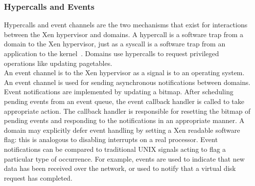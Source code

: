\subsubsection*{Hypercalls and Events}
Hypercalls and event channels are the two mechanisms that exist for interactions between the Xen hypervisor and domains. A hypercall is a software trap from a domain to the Xen hypervisor, just as a syscall is a software trap from an application to the kernel~\cite{hypercall}. Domains use hypercalls to request privileged operations like updating pagetables. 
\\[3mm]
An event channel is to the Xen hypervisor as a signal is to an operating system. An event channel is used for sending asynchronous notifications between domains. Event notifications are implemented by updating a bitmap. After scheduling pending events from an event queue, the event callback handler is called to take appropriate action. The callback handler is responsible for resetting the bitmap of pending events and responding to the notifications in an appropriate manner. A domain may explicitly defer event handling by setting a Xen readable software flag: this is analogous to disabling interrupts on a real processor. Event notifications can be compared to traditional UNIX signals acting to flag a particular type of occurrence. For example, events are used to indicate that new data has been received over the network, or used to notify that a virtual disk request has completed. 

